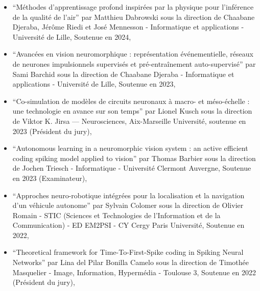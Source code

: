\documentclass[10pt,french,a4paper]{article}%
\begin{document}
\begin{itemize}



    \item ``Méthodes d'apprentissage profond inspirées par la physique pour l'inférence de la qualité de l'air'' par Matthieu Dabrowski sous la direction de Chaabane Djeraba, Jérôme Riedi et José Mennesson - Informatique et applications - Université de Lille, Soutenue en 2024,

    \item ``Avancées en vision neuromorphique : représentation événementielle, réseaux de neurones impulsionnels supervisés et pré-entraînement auto-supervisé'' par Sami Barchid sous la direction de Chaabane Djeraba - Informatique et applications - Université de Lille, Soutenue en 2023,

    \item ``Co-simulation de modèles de circuits neuronaux à macro- et méso-échelle : une technologie en avance sur son temps'' par Lionel Kusch sous la direction de Viktor K. Jirsa --- Neurosciences, Aix-Marseille Université, soutenue en 2023 (Président du jury),

    \item ``Autonomous learning in a neuromorphic vision system : an active efficient coding spiking model applied to vision'' par Thomas Barbier sous la direction de Jochen Triesch - Informatique - Université Clermont Auvergne, Soutenue en 2023  (Examinateur),

    \item ``Approches neuro-robotique intégrées pour la localisation et la navigation d'un véhicule autonome'' par Sylvain Colomer sous la direction de Olivier Romain - STIC (Sciences et Technologies de l'Information et de la Communication) - ED EM2PSI - CY Cergy Paris Université, Soutenue en 2022,

    \item ``Theoretical framework for Time-To-First-Spike coding in Spiking Neural Networks'' par Lina del Pilar Bonilla Camelo sous la direction de Timothée Masquelier - Image, Information, Hypermédia - Toulouse 3, Soutenue en 2022 (Président du jury),


\end{itemize}
\end{document}
